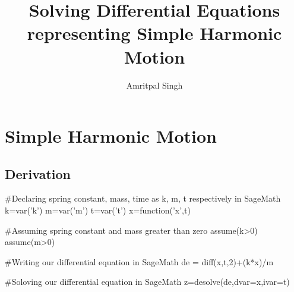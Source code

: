 \documentclass{report}
\title{Solving Differential Equations representing Simple Harmonic Motion}
\author{Amritpal Singh}
\begin{document}
\begin{titlepage}
\maketitle
\tableofcontents
\end{titlepage}


\chapter{Simple Harmonic Motion}
\section{Derivation}
\begin{sagesilent}
#Declaring spring constant, mass, time as k, m, t respectively in SageMath
k=var('k')
m=var('m')
t=var('t')
x=function('x',t)

#Assuming spring constant and mass greater than zero
assume(k>0)
assume(m>0)

#Writing our differential equation in SageMath
de = diff(x,t,2)+(k*x)/m

#Soloving our differential equation in SageMath
z=desolve(de,dvar=x,ivar=t)
\end{sagesilent}
\end{document}
